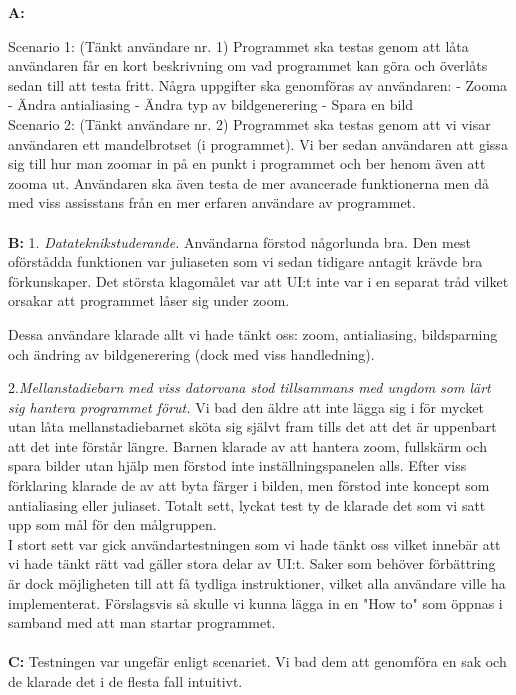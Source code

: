 \documentclass[11pt]{article} %
\begin{document}
{\bf A:}

Scenario 1: (Tänkt användare nr. 1) Programmet ska testas genom att låta användaren får en kort beskrivning om vad programmet kan göra och överlåts sedan till att testa fritt. 
Några uppgifter ska genomföras av användaren:
- Zooma
- Ändra antialiasing
- Ändra typ av bildgenerering
- Spara en bild \\

Scenario 2: (Tänkt användare nr. 2) Programmet ska testas genom att vi visar användaren ett mandelbrotset (i programmet). Vi ber sedan användaren att gissa sig till hur man zoomar in på en punkt i programmet och ber henom även att zooma ut. Användaren ska även testa de mer avancerade funktionerna men då med viss assisstans från en mer erfaren användare av programmet.
\\
\\
{\bf B:} 
1. \emph{Datateknikstuderande.} Användarna förstod någorlunda bra. Den mest oförstådda funktionen var juliaseten som vi sedan tidigare antagit krävde bra förkunskaper. Det största klagomålet var att UI:t inte var i en separat tråd vilket orsakar att programmet låser sig under zoom.

Dessa användare klarade allt vi hade tänkt oss: zoom, antialiasing, bildsparning och ändring av bildgenerering (dock med viss handledning).

2.\emph{Mellanstadiebarn med viss datorvana stod tillsammans med ungdom som lärt sig hantera programmet förut.}
Vi bad den äldre att inte lägga sig i för mycket utan låta mellanstadiebarnet sköta sig självt fram tills det att det är uppenbart att det inte förstår längre.
Barnen klarade av att hantera zoom, fullskärm och spara bilder utan hjälp men förstod inte inställningspanelen alls. 
Efter viss förklaring klarade de av att byta färger i bilden, men förstod inte koncept som antialiasing eller juliaset.
Totalt sett, lyckat test ty de klarade det som vi satt upp som mål för den målgruppen.\\

\noindent I stort sett var gick användartestningen som vi hade tänkt oss vilket innebär att vi hade tänkt rätt vad gäller stora delar av UI:t. Saker som behöver förbättring är dock möjligheten till att få tydliga instruktioner, vilket alla användare ville ha implementerat.
Förslagsvis så skulle vi kunna lägga in en "How to" som öppnas i samband med att man startar programmet.
\\
\\
{\bf C:} Testningen var ungefär enligt scenariet. Vi bad dem att genomföra en sak och de klarade det i de flesta fall intuitivt. 
\end{document}
